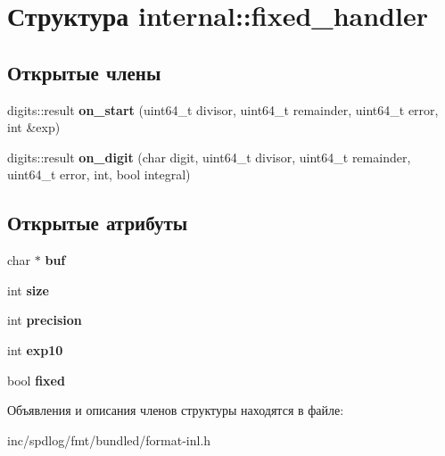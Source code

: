 \hypertarget{structinternal_1_1fixed__handler}{}\section{Структура internal\+:\+:fixed\+\_\+handler}
\label{structinternal_1_1fixed__handler}
\subsection*{Открытые члены}
\begin{DoxyCompactItemize}
\item 
\mbox{\label{structinternal_1_1fixed__handler_a57f264561c128d7b290f1b8603b7eac1}} 
digits\+::result {\bfseries on\+\_\+start} (uint64\+\_\+t divisor, uint64\+\_\+t remainder, uint64\+\_\+t error, int \&exp)
\item 
\mbox{\label{structinternal_1_1fixed__handler_a6cd9780a01a4d510fca68cb9a215980a}} 
digits\+::result {\bfseries on\+\_\+digit} (char digit, uint64\+\_\+t divisor, uint64\+\_\+t remainder, uint64\+\_\+t error, int, bool integral)
\end{DoxyCompactItemize}
\subsection*{Открытые атрибуты}
\begin{DoxyCompactItemize}
\item 
\mbox{\label{structinternal_1_1fixed__handler_acb09a7f2d9476ce2f04bd5c54f386f9c}} 
char $\ast$ {\bfseries buf}
\item 
\mbox{\label{structinternal_1_1fixed__handler_ad68dcec42e89ef1c068de5384eeb3bc5}} 
int {\bfseries size}
\item 
\mbox{\label{structinternal_1_1fixed__handler_ac7c44864b248438330352fe7ef6f2a04}} 
int {\bfseries precision}
\item 
\mbox{\label{structinternal_1_1fixed__handler_a90bf7cb58d3c9da8ced77fa6cd727c7f}} 
int {\bfseries exp10}
\item 
\mbox{\label{structinternal_1_1fixed__handler_a91e33c6ef799cc2ae1e56cb112103975}} 
bool {\bfseries fixed}
\end{DoxyCompactItemize}


Объявления и описания членов структуры находятся в файле\+:\begin{DoxyCompactItemize}
\item 
inc/spdlog/fmt/bundled/format-\/inl.\+h\end{DoxyCompactItemize}
